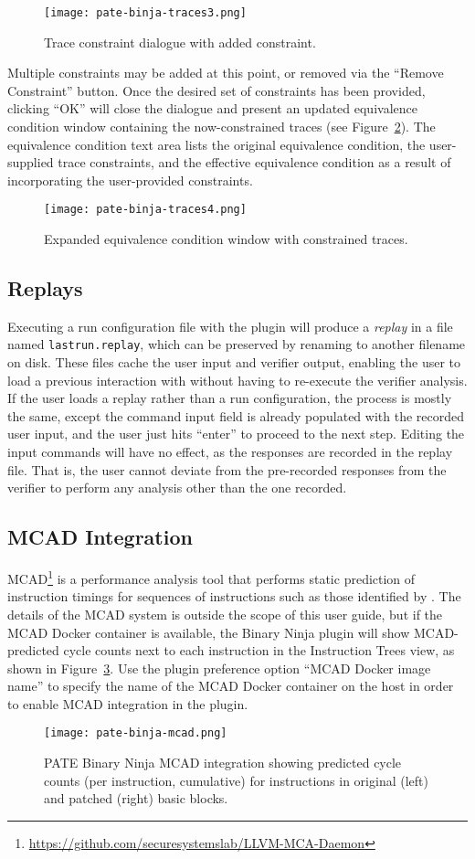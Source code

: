 \begin{figure}[h]
  \centering
  \texttt{[image: pate-binja-traces3.png]}
  \caption{Trace constraint dialogue with added constraint.}
  \label{fig:trace-constr-one}
\end{figure}

Multiple constraints may be added at this point, or removed via the ``Remove Constraint'' button. Once the desired set of constraints
has been provided, clicking ``OK'' will close the dialogue and present an updated equivalence condition window containing the
now-constrained traces (see Figure~\ref{fig:equiv-cond-constrained}). The equivalence condition text area lists the original equivalence condition, the user-supplied trace constraints, and the effective equivalence condition as a result of incorporating the user-provided constraints.

\begin{figure}[h]
  \centering
  \texttt{[image: pate-binja-traces4.png]}
  \caption{Expanded equivalence condition window with constrained traces.}
  \label{fig:equiv-cond-constrained}
\end{figure}

\subsection{Replays}

Executing a run configuration file with the \pate{} plugin will produce a \emph{replay} in a file named \texttt{lastrun.replay}, which can be preserved by renaming to another filename on disk.
These files cache the user input and verifier output, enabling the user to load a previous interaction with \pate{} without having to re-execute the verifier analysis.
If the user loads a replay rather than a run configuration, the process is mostly the same, except the command input field is already populated with the recorded user input, and the user just hits ``enter'' to proceed to the next step.
Editing the input commands will have no effect, as the responses are recorded in the replay file.
That is, the user cannot deviate from the pre-recorded responses from the \pate{} verifier to perform any analysis other than the one recorded.

\subsection{MCAD Integration}

MCAD\footnote{\url{https://github.com/securesystemslab/LLVM-MCA-Daemon}} is a performance analysis tool that performs static prediction of instruction timings for sequences of instructions such as those identified by \pate{}.
The details of the MCAD system is outside the scope of this user guide, but if the MCAD Docker container is available, the \pate{} Binary Ninja plugin will show MCAD-predicted cycle counts next to each instruction in the Instruction Trees view, as shown in Figure~\ref{fig:mcad}.
Use the \pate{} plugin preference option ``MCAD Docker image name'' to specify the name of the MCAD Docker container on the host in order to enable MCAD integration in the \pate{} plugin.

\begin{figure}[h]
  \centering
  \texttt{[image: pate-binja-mcad.png]}
  \caption{PATE Binary Ninja MCAD integration showing predicted cycle counts (per instruction, cumulative) for instructions in original (left) and patched (right) basic blocks.}
  \label{fig:mcad}
\end{figure}